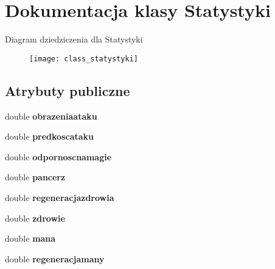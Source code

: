 \hypertarget{class_statystyki}{}\section{Dokumentacja klasy Statystyki}
\label{class_statystyki}
Diagram dziedziczenia dla Statystyki\begin{figure}[H]
\begin{center}
\leavevmode
\texttt{[image: class\_statystyki]}
\end{center}
\end{figure}
\subsection*{Atrybuty publiczne}
\begin{DoxyCompactItemize}
\item 
double {\bfseries obrazeniaataku}\hypertarget{class_statystyki_a3a4da2cc1e45164c741ab47b1beea1d2}{}\label{class_statystyki_a3a4da2cc1e45164c741ab47b1beea1d2}

\item 
double {\bfseries predkoscataku}\hypertarget{class_statystyki_a6dd1e90c5341b56d3c14be3e5b9a42fc}{}\label{class_statystyki_a6dd1e90c5341b56d3c14be3e5b9a42fc}

\item 
double {\bfseries odpornoscnamagie}\hypertarget{class_statystyki_a4a80a90f2604c8515891023194b219c3}{}\label{class_statystyki_a4a80a90f2604c8515891023194b219c3}

\item 
double {\bfseries pancerz}\hypertarget{class_statystyki_aee99c9a49f7e9439bcbd1b4ba929c787}{}\label{class_statystyki_aee99c9a49f7e9439bcbd1b4ba929c787}

\item 
double {\bfseries regeneracjazdrowia}\hypertarget{class_statystyki_a923d6e2bcd54e60a2503fc6363262aaf}{}\label{class_statystyki_a923d6e2bcd54e60a2503fc6363262aaf}

\item 
double {\bfseries zdrowie}\hypertarget{class_statystyki_a943bcebae41ee3f28aa9273a8d277bfc}{}\label{class_statystyki_a943bcebae41ee3f28aa9273a8d277bfc}

\item 
double {\bfseries mana}\hypertarget{class_statystyki_aed7bfef1a0d608a4634e2a241c92e8f5}{}\label{class_statystyki_aed7bfef1a0d608a4634e2a241c92e8f5}

\item 
double {\bfseries regeneracjamany}\hypertarget{class_statystyki_adf285bc31a4e56f42c03eb2a618b5888}{}\label{class_statystyki_adf285bc31a4e56f42c03eb2a618b5888}


\end{DoxyCompactItemize}
